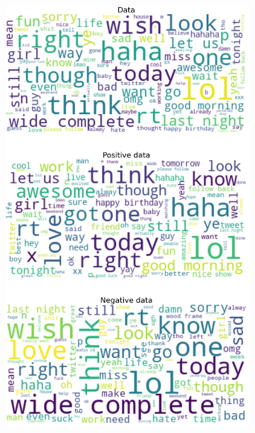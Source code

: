 \documentclass{article}
\begin{document}
\begin{itemize}
\begin{figure}[H]
\begin{subfigure}[b]{0.24\textwidth}
\includegraphics[width=\textwidth]{chapter-06/section-01-01/17/visualization/3/wordcloud.png}
\end{subfigure}
\begin{subfigure}[b]{0.24\textwidth}
\centering

\end{subfigure}
\end{figure}
\end{itemize}
\end{document}
